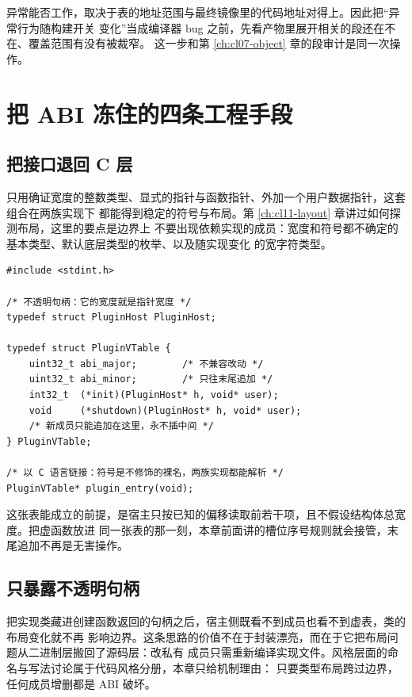 \documentclass[12pt,a4paper,fontset=fandol]{ctexbook}
\newcommand{\Lang}[1]{\textsf{#1}}
\newcommand{\CL}{\Lang{C}}
\begin{document}
\begin{note}[title={展开信息也是一种被链接决定的产物}]
异常能否工作，取决于表的地址范围与最终镜像里的代码地址对得上。因此把“异常行为随构建开关
变化”当成编译器 bug 之前，先看产物里展开相关的段还在不在、覆盖范围有没有被裁窄。
这一步和第 \ref{ch:cl07-object} 章的段审计是同一次操作。
\end{note}

\section{把 ABI 冻住的四条工程手段}\label{sec:cl13-stable}

\subsection{把接口退回 \CL{} 层}\label{sec:cl13-cboundary}

只用确证宽度的整数类型、显式的指针与函数指针、外加一个用户数据指针，这套组合在两族实现下
都能得到稳定的符号与布局。第 \ref{ch:cl11-layout} 章讲过如何探测布局，这里的要点是边界上
不要出现依赖实现的成员：宽度和符号都不确定的基本类型、默认底层类型的枚举、以及随实现变化
的宽字符类型。

\begin{lstlisting}[style=cstyle, caption={插件边界的最小 ABI 形状：句柄、版本与函数指针表}]
#include <stdint.h>

/* 不透明句柄：它的宽度就是指针宽度 */
typedef struct PluginHost PluginHost;

typedef struct PluginVTable {
    uint32_t abi_major;        /* 不兼容改动 */
    uint32_t abi_minor;        /* 只往末尾追加 */
    int32_t  (*init)(PluginHost* h, void* user);
    void     (*shutdown)(PluginHost* h, void* user);
    /* 新成员只能追加在这里，永不插中间 */
} PluginVTable;

/* 以 C 语言链接：符号是不修饰的裸名，两族实现都能解析 */
PluginVTable* plugin_entry(void);
\end{lstlisting}

这张表能成立的前提，是宿主只按已知的偏移读取前若干项，且不假设结构体总宽度。把虚函数放进
同一张表的那一刻，本章前面讲的槽位序号规则就会接管，末尾追加不再是无害操作。

\subsection{只暴露不透明句柄}\label{sec:cl13-opaque}

把实现类藏进创建函数返回的句柄之后，宿主侧既看不到成员也看不到虚表，类的布局变化就不再
影响边界。这条思路的价值不在于封装漂亮，而在于它把布局问题从二进制层搬回了源码层：改私有
成员只需重新编译实现文件。风格层面的命名与写法讨论属于代码风格分册，本章只给机制理由：
只要类型布局跨过边界，任何成员增删都是 ABI 破坏。
\end{document}
